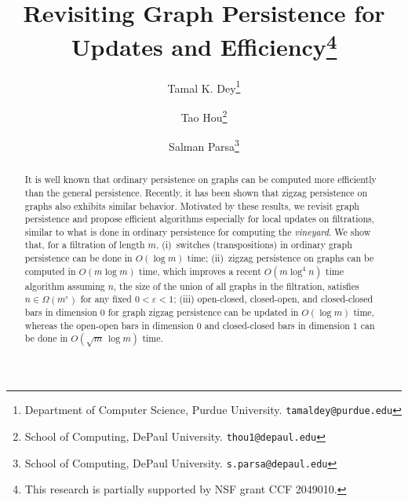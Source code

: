 \documentclass[letterpaper,11pt]{article}
\theoremstyle{mythmstyle}
\theoremstyle{mydefstyle}
\theoremstyle{plain}
\theoremstyle{definition}
\newcommand{\<}[1]{\langle #1\rangle}
\theoremstyle{definition}
\begin{document}
\title{Revisiting Graph Persistence for Updates and Efficiency\thanks{This research is partially supported by NSF grant CCF 2049010.}}


\author{Tamal K. Dey\thanks{Department of Computer Science, Purdue University. \texttt{tamaldey@purdue.edu}}
\and Tao Hou\thanks{School of Computing, DePaul University. \texttt{thou1@depaul.edu}}
\and Salman Parsa\thanks{School of Computing, DePaul University. \texttt{s.parsa@depaul.edu}}
}

\date{}

\maketitle
\thispagestyle{empty}

\begin{abstract}
It is well known that ordinary persistence on graphs can be computed more
efficiently than the general persistence. Recently, it has  been shown
that zigzag persistence on graphs also exhibits similar behavior.
Motivated by these results, we revisit graph persistence 
and propose
efficient algorithms especially for 
local updates on filtrations, similar to what is done in ordinary persistence for computing the \emph{vineyard}. We show that, for
a filtration of length $m$,
(i)~switches
(transpositions) in ordinary graph persistence can be done in $O(\log m)$ time;
(ii)~zigzag persistence on graphs can be computed in $O(m\log m)$ time, which
improves a recent $O(m\log^4n)$ time algorithm assuming
$n$, the size of the union of all graphs in the filtration, satisfies
$n\in\Omega({m^\varepsilon})$ for any fixed $0<\varepsilon<1$; 
(iii) open-closed, closed-open,
and closed-closed bars
in dimension $0$ for graph zigzag persistence can be updated in
$O(\log m)$ time, whereas the open-open bars in dimension
$0$ and closed-closed bars in dimension $1$ can be done in $O(\sqrt{m}\,\log m)$ time.
\end{abstract}

\newpage
\setcounter{page}{1}
\end{document}
